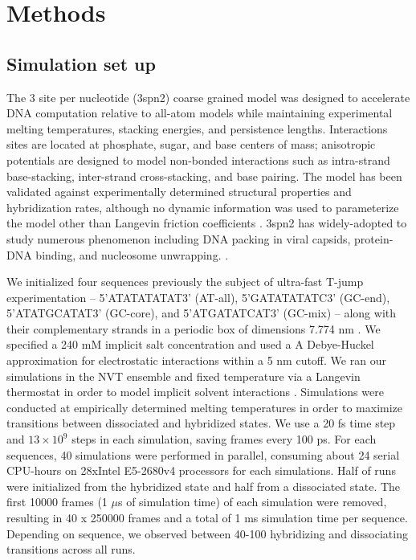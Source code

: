 \documentclass[journal=jpcbfk,manuscript=article]{achemso}
\begin{document}
\section{\label{sec:methods}Methods}

\subsection{\label{sec:methods}Simulation set up}

The 3 site per nucleotide (3spn2) coarse grained model was designed to accelerate DNA computation relative to all-atom models while maintaining experimental melting temperatures, stacking energies, and persistence lengths\citep{Hinckley2013AnHybridization}. Interactions sites are located at phosphate, sugar, and base centers of mass; anisotropic potentials are designed to model non-bonded interactions such as intra-strand base-stacking, inter-strand cross-stacking, and base pairing. The model has been validated against experimentally determined structural properties and hybridization rates, although no dynamic information was used to parameterize the model other than Langevin friction coefficients \citep{Hinckley2013AnHybridization, Hinckley2014Coarse-grainedEffects}. 3spn2 has widely-adopted to study numerous phenomenon including DNA packing in viral capsids, protein-DNA binding, and nucleosome unwrapping. \citep{Cordoba2017AIons, Lu2020OpenAWSEMSummary, Lequieu2016Tension-dependentUnwrapping}. 

We initialized four sequences previously the subject of ultra-fast T-jump experimentation -- 5'ATATATATAT3' (AT-all), 5'GATATATATC3' (GC-end), 5'ATATGCATAT3' (GC-core), and 5'ATGATATCAT3' (GC-mix) -- along with their complementary strands in a periodic box of dimensions 7.774 nm \citep{Sanstead2016, Phys2014}. We specified a 240 mM implicit salt concentration and used a A Debye-Huckel approximation for electrostatic interactions within a 5 nm cutoff. We ran our simulations in the NVT ensemble and fixed temperature via a Langevin thermostat in order to model implicit solvent interactions \citep{Schneider1978Molecular-dynamicsTransitions}. Simulations were conducted at empirically determined  melting temperatures in order to maximize transitions between dissociated and hybridized states. We use a 20 fs time step and $13\times10^{9}$ steps in each simulation, saving frames every 100 ps. For each sequences, 40 simulations were performed in parallel, consuming about 24 serial CPU-hours on 28xIntel E5-2680v4 processors for each simulations. Half of runs were initialized from the hybridized state and half from a dissociated state. The first 10000 frames (1 $\mu$s of simulation time) of each simulation were removed, resulting in 40 x 250000 frames and a total of 1 ms simulation time per sequence. Depending on sequence, we observed between 40-100 hybridizing and dissociating transitions across all runs.
\end{document}

